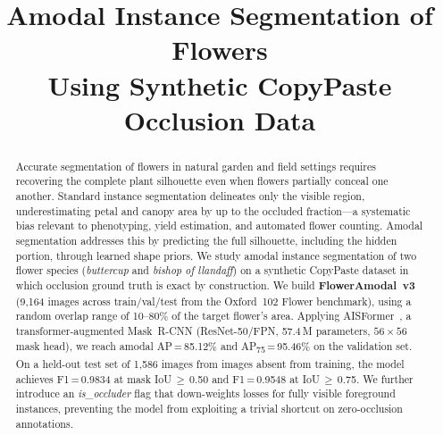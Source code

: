 \documentclass[conference]{IEEEtran}
\begin{document}
\title{Amodal Instance Segmentation of Flowers\\
Using Synthetic CopyPaste Occlusion Data}

\author{
  \and
  \and
}

\maketitle

\begin{abstract}
Accurate segmentation of flowers in natural garden and field settings
requires recovering the complete plant silhouette even when flowers partially
conceal one another.
Standard instance segmentation delineates only the visible region,
underestimating petal and canopy area by up to the occluded fraction—a
systematic bias relevant to phenotyping, yield estimation, and automated
flower counting.
Amodal segmentation addresses this by predicting the full silhouette,
including the hidden portion, through learned shape priors.
We study amodal instance segmentation of two flower species
(\textit{buttercup} and \textit{bishop of llandaff}) on a synthetic
CopyPaste dataset in which occlusion ground truth is exact by construction.
We build \textbf{FlowerAmodal~v3} (9{,}164 images across train/val/test
from the Oxford~102 Flower benchmark), using a random overlap range of
10--80\% of the target flower's area.
Applying AISFormer~\cite{tran2022aisformer}, a transformer-augmented
Mask~R-CNN (ResNet-50/FPN, 57.4\,M parameters, $56{\times}56$ mask head),
we reach amodal AP\,=\,85.12\% and AP\textsubscript{75}\,=\,95.46\% on the
validation set.
On a held-out test set of 1{,}586 images from images absent from training,
the model achieves F1\,=\,0.9834 at mask IoU\,$\geq$\,0.50 and
F1\,=\,0.9548 at IoU\,$\geq$\,0.75.
We further introduce an \emph{is\_occluder} flag that down-weights losses for
fully visible foreground instances, preventing the model from exploiting a
trivial shortcut on zero-occlusion annotations.
\end{abstract}
\end{document}
